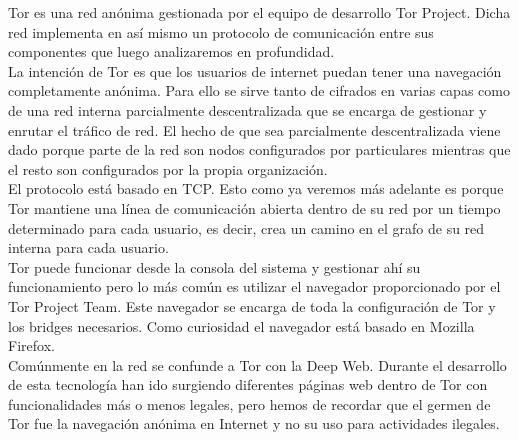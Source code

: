 Tor es una red anónima gestionada por el equipo de desarrollo Tor Project. Dicha red implementa en así mismo un protocolo de comunicación entre sus componentes que luego analizaremos en profundidad.\\
La intención de Tor es que los usuarios de internet puedan tener una navegación completamente anónima. Para ello se sirve tanto de cifrados en varias capas como de una red interna parcialmente descentralizada que se encarga de gestionar y enrutar el tráfico de red. El hecho de que sea parcialmente descentralizada viene dado porque parte de la red son nodos configurados por particulares mientras que el resto son configurados por la propia organización.\\
El protocolo está basado en TCP. Esto como ya veremos más adelante es porque Tor mantiene una línea de comunicación abierta dentro de su red por un tiempo determinado para cada usuario, es decir, crea un camino en el grafo de su red interna para cada usuario.\\
Tor puede funcionar desde la consola del sistema y gestionar ahí su funcionamiento pero lo más común es utilizar el navegador proporcionado por el Tor Project Team. Este navegador se encarga de toda la configuración de Tor y los bridges necesarios. Como curiosidad el navegador está basado en Mozilla Firefox.\\
Comúnmente en la red se confunde a Tor con la Deep Web. Durante el desarrollo de esta tecnología han ido surgiendo diferentes páginas web dentro de Tor con funcionalidades más o menos legales, pero hemos de recordar que el germen de Tor fue la navegación anónima en Internet y no su uso para actividades ilegales.